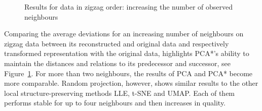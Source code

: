 \documentclass[pdftex,12pt,a4paper]{report}
\begin{document}
\begin{figure}[!htb]
    \caption{Results for data in zigzag order: increasing the number of observed neighbours} \label{fig:num_neigh_zigzag}
\end{figure}

Comparing the average deviations for an increasing number of neighbours on zigzag data between its reconstructed and original data and respectively transformed representation with the original data, highlights PCA*'s ability to maintain the distances and relations to its predecessor and successor, see Figure~\ref{fig:num_neigh_zigzag}.
For more than two neighbours, the results of PCA and PCA* become more comparable.
Random projection, however, shows similar results to the other local structure-preserving methods LLE, t-SNE and UMAP.
Each of them performs stable for up to four neighbours and then increases in quality.
\end{document}
